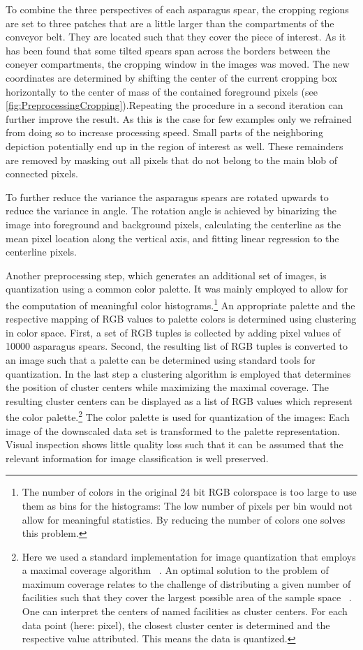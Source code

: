 \bigskip
To combine the three perspectives of each asparagus spear, the cropping regions are set to three patches that are a little larger than the compartments of the conveyor belt. They are located such that they cover the piece of interest. As it has been found that some tilted spears span across the borders between the coneyer compartments, the cropping window in the images was moved. The new coordinates are determined by shifting the center of the current cropping box horizontally to the center of mass of the contained foreground pixels (see \autoref{fig:PreprocessingCropping}).Repeating the procedure in a second iteration can further improve the result. As this is the case for few examples only we refrained from doing so to increase processing speed. Small parts of the neighboring depiction potentially end up in the region of interest as well. These remainders are removed by masking out all pixels that do not belong to the main blob of connected pixels.

\bigskip
To further reduce the variance the asparagus spears are rotated upwards to reduce the variance in angle. The rotation angle is achieved by binarizing the image into foreground and background pixels, calculating the centerline as the mean pixel location along the vertical axis, and fitting linear regression to the centerline pixels.

\bigskip
Another preprocessing step, which generates an additional set of images, is quantization using a common color palette. It was mainly employed to allow for the computation of meaningful color histograms.\footnote{ The number of colors in the original 24 bit RGB colorspace is too large to use them as bins for the histograms: The low number of pixels per bin would not allow for meaningful statistics. By reducing the number of colors one solves this problem.}  An appropriate palette and the respective mapping of RGB values to palette colors is determined using clustering in color space. First, a set of RGB tuples is collected by adding pixel values of 10000 asparagus spears. Second, the resulting list of RGB tuples is converted to an image such that a palette can be determined using standard tools for quantization. In the last step a clustering algorithm is employed that determines the position of cluster centers while maximizing the maximal coverage. The resulting cluster centers can be displayed as a list of RGB values which represent the color palette.\footnote{Here we used a standard implementation for image quantization that employs a maximal coverage algorithm ~\citep{pil_quantization}. An optimal solution to the problem of maximum coverage relates to the challenge of distributing a given number of facilities such that they cover the largest possible area of the sample space ~\citep{zarandi2011large}. One can interpret the centers of named facilities as cluster centers. For each data point (here: pixel), the closest cluster center is determined and the respective value attributed. This means the data is quantized.} The color palette is used for quantization of the images: Each image of the downscaled data set is transformed to the palette representation. Visual inspection shows little quality loss such that it can be assumed that the relevant information for image classification is well preserved.

